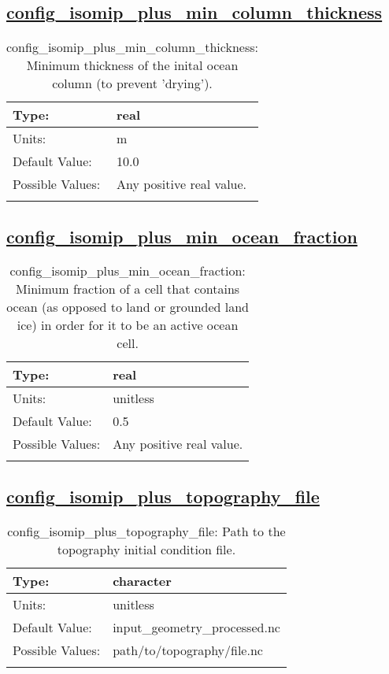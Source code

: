 \subsection[config\_isomip\_plus\_min\_column\_thickness]{\hyperref[sec:nm_tab_isomip_plus]{config\_isomip\_plus\_min\_column\_thickness}}
\label{subsec:nm_sec_config_isomip_plus_min_column_thickness}
\begin{center}
\begin{longtable}{| p{2.0in} || p{4.0in} |}
    \hline
    Type: & real \\
    \hline
    Units: & \si{m} \\
    \hline
    Default Value: & 10.0 \\
    \hline
    Possible Values: & Any positive real value. \\
    \hline
    \caption{config\_isomip\_plus\_min\_column\_thickness: Minimum thickness of the inital ocean column (to prevent 'drying').}
\end{longtable}
\end{center}
\subsection[config\_isomip\_plus\_min\_ocean\_fraction]{\hyperref[sec:nm_tab_isomip_plus]{config\_isomip\_plus\_min\_ocean\_fraction}}
\label{subsec:nm_sec_config_isomip_plus_min_ocean_fraction}
\begin{center}
\begin{longtable}{| p{2.0in} || p{4.0in} |}
    \hline
    Type: & real \\
    \hline
    Units: & \si{unitless} \\
    \hline
    Default Value: & 0.5 \\
    \hline
    Possible Values: & Any positive real value. \\
    \hline
    \caption{config\_isomip\_plus\_min\_ocean\_fraction: Minimum fraction of a cell that contains ocean (as opposed to land or grounded land ice) in order for it to be an active ocean cell.}
\end{longtable}
\end{center}
\subsection[config\_isomip\_plus\_topography\_file]{\hyperref[sec:nm_tab_isomip_plus]{config\_isomip\_plus\_topography\_file}}
\label{subsec:nm_sec_config_isomip_plus_topography_file}
\begin{center}
\begin{longtable}{| p{2.0in} || p{4.0in} |}
    \hline
    Type: & character \\
    \hline
    Units: & \si{unitless} \\
    \hline
    Default Value: & input\_geometry\_processed.nc \\
    \hline
    Possible Values: & path/to/topography/file.nc \\
    \hline
    \caption{config\_isomip\_plus\_topography\_file: Path to the topography initial condition file.}
\end{longtable}
\end{center}
